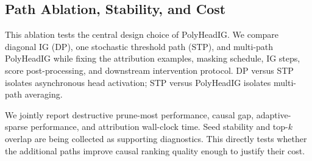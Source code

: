 \subsection{Path Ablation, Stability, and Cost}
\label{sec:exp:ablations}

This ablation tests the central design choice of PolyHeadIG. We compare diagonal IG (DP), one stochastic threshold path (STP), and multi-path PolyHeadIG while fixing the attribution examples, masking schedule, IG steps, score post-processing, and downstream intervention protocol. DP versus STP isolates asynchronous head activation; STP versus PolyHeadIG isolates multi-path averaging.

We jointly report destructive prune-most performance, causal gap, adaptive-sparse performance, and attribution wall-clock time. Seed stability and top-$k$ overlap are being collected as supporting diagnostics. This directly tests whether the additional paths improve causal ranking quality enough to justify their cost.

